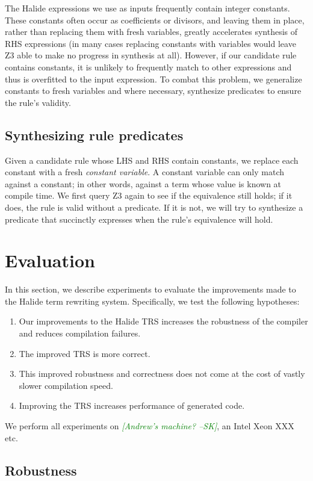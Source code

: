 \documentclass[sigplan,review,anonymous]{acmart}\settopmatter{printfolios=true,printccs=false,printacmref=false}
\newcommand{\sak}[1]{\textcolor{green}{\textit{[{#1} --SK]}}}
\begin{document}
The Halide expressions we use as inputs frequently contain integer constants. These constants often occur as coefficients or divisors, and leaving them in place, rather than replacing them with fresh variables, greatly accelerates synthesis of RHS expressions (in many cases replacing constants with variables would leave Z3 able to make no progress in synthesis at all). However, if our candidate rule contains constants, it is unlikely to frequently match to other expressions and thus is overfitted to the input expression. To combat this problem, we generalize constants to fresh variables and where necessary, synthesize predicates to ensure the rule's validity.

\subsection{Synthesizing rule predicates}

Given a candidate rule whose LHS and RHS contain constants, we replace each constant with a fresh \emph{constant variable}. A constant variable can only match against a constant; in other words, against a term whose value is known at compile time. We first query Z3 again to see if the equivalence still holds; if it does, the rule is valid without a predicate. If it is not, we will try to synthesize a predicate that succinctly expresses when the rule's equivalence will hold.


\section{Evaluation}
In this section, we describe experiments to evaluate the improvements made to the Halide term rewriting system.  Specifically, we
test the following hypotheses:
\begin{enumerate}
\item Our improvements to the Halide TRS increases the robustness of the compiler and reduces compilation failures.
\item The improved TRS is more correct.
\item This improved robustness and correctness does not come at the cost of vastly slower compilation speed.
\item Improving the TRS increases performance of generated code.
\end{enumerate}

We perform all experiments on \sak{Andrew's machine?}, an Intel Xeon XXX etc.

\subsection{Robustness}
\end{document}
